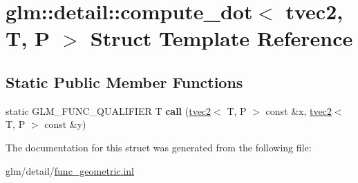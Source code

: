 \hypertarget{structglm_1_1detail_1_1compute__dot_3_01tvec2_00_01T_00_01P_01_4}{\section{glm\-:\-:detail\-:\-:compute\-\_\-dot$<$ tvec2, T, P $>$ Struct Template Reference}
\label{structglm_1_1detail_1_1compute__dot_3_01tvec2_00_01T_00_01P_01_4}
}
\subsection*{Static Public Member Functions}
\begin{DoxyCompactItemize}
\item 
\hypertarget{structglm_1_1detail_1_1compute__dot_3_01tvec2_00_01T_00_01P_01_4_a351e36e5c7ed1bd74b9e1631c4fffc07}{static G\-L\-M\-\_\-\-F\-U\-N\-C\-\_\-\-Q\-U\-A\-L\-I\-F\-I\-E\-R T {\bfseries call} (\hyperlink{structglm_1_1tvec2}{tvec2}$<$ T, P $>$ const \&x, \hyperlink{structglm_1_1tvec2}{tvec2}$<$ T, P $>$ const \&y)}\label{structglm_1_1detail_1_1compute__dot_3_01tvec2_00_01T_00_01P_01_4_a351e36e5c7ed1bd74b9e1631c4fffc07}

\end{DoxyCompactItemize}


The documentation for this struct was generated from the following file\-:\begin{DoxyCompactItemize}
\item 
glm/detail/\hyperlink{func__geometric_8inl}{func\-\_\-geometric.\-inl}\end{DoxyCompactItemize}
